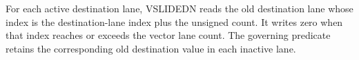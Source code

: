 For each active destination lane, VSLIDEDN reads the old destination lane whose
index is the destination-lane index plus the unsigned count.  It writes zero
when that index reaches or exceeds the vector lane count.  The governing
predicate retains the corresponding old destination value in each inactive
lane.
